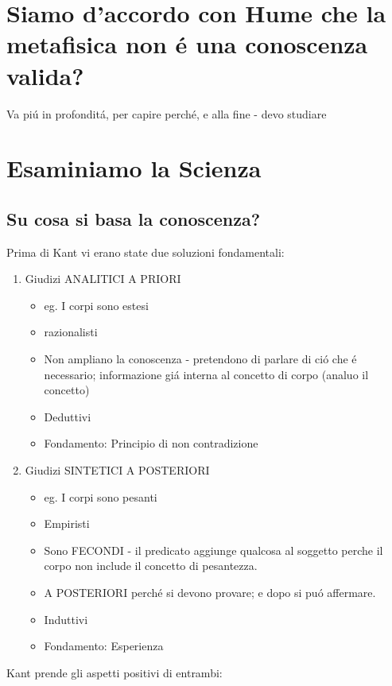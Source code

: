 \documentclass{article}
\title{\jobname}
\author{Eugenio Animali}
\begin{document}
\maketitle

\section{Siamo d'accordo con Hume che la metafisica non é una conoscenza valida?}
Va piú in profonditá, per capire perché, e alla fine - devo studiare

\section{Esaminiamo la Scienza}

\subsection{Su cosa si basa la conoscenza?}
Prima di Kant vi erano state due soluzioni fondamentali:
\begin{enumerate}
    \item Giudizi ANALITICI A PRIORI
    \begin{itemize}
        \item eg. I corpi sono estesi
        \item razionalisti
        \item Non ampliano la conoscenza - pretendono di parlare di ció che é necessario; informazione giá interna al concetto di corpo (analuo il concetto)
        \item Deduttivi
        \item Fondamento: Principio di non contradizione
    \end{itemize}
    \item Giudizi SINTETICI A POSTERIORI 
    \begin{itemize}
        \item eg. I corpi sono pesanti
        \item Empiristi
        \item Sono FECONDI - il predicato aggiunge qualcosa al soggetto perche il corpo non include il concetto di pesantezza.
        \item A POSTERIORI perché si devono provare; e dopo si puó affermare.
        \item Induttivi
        \item Fondamento: Esperienza
    \end{itemize}
\end{enumerate}
Kant prende gli aspetti positivi di entrambi:
\end{document}
